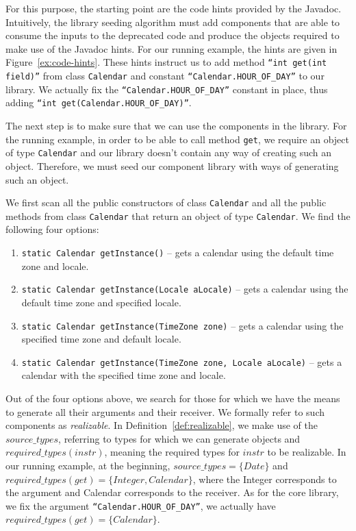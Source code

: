 \documentclass[sigconf,review,anonymous]{acmart}
\begin{document}
For this purpose, the starting point are the code hints provided by the Javadoc.
Intuitively, the library seeding algorithm must add components that are able to consume the
inputs to the deprecated code and produce the objects required to make use
of the Javadoc hints.
%
For our running example, the hints are given in Figure~\ref{ex:code-hints}.
These hints instruct us to add method \texttt{``int get(int field)''} from class
\texttt{Calendar} and constant \texttt{``Calendar.HOUR\_OF\_DAY''} to our library.
We actually fix the \texttt{``Calendar.HOUR\_OF\_DAY''} constant
in place, thus adding \texttt{``int get(Calendar.HOUR\_OF\_DAY)''}.

The next step is to make sure that we can use the components in the library.
For the running example, in order to be able to call method \texttt{get}, we require an object of
type \texttt{Calendar} and our library doesn't contain any way of creating such an object.
Therefore, we must seed our component library with ways of generating such an object.

We first scan all the public constructors of class \texttt{Calendar}
and all the public methods from class \texttt{Calendar} that return an object of type \texttt{Calendar}. We find the following four options:

\begin{enumerate}
  \item \texttt{static Calendar	getInstance()} -- gets a calendar using the default time zone and locale.
  \item \texttt{static Calendar getInstance(Locale aLocale)} -- gets a calendar using the default time zone and specified locale.
  \item \texttt{static Calendar	getInstance(TimeZone zone)} -- gets a calendar using the specified time zone and default locale.
  \item \texttt{static Calendar	getInstance(TimeZone zone, Locale aLocale)} -- gets a calendar with the specified time zone and locale.
\end{enumerate}

%
Out of the four options above, we search for those for which we have the means to generate all their arguments and their receiver. We formally refer to such components as {\em realizable}.
In Definition~\ref{def:realizable}, we make use of the $source\_types$, referring to types
for which we can generate objects and $required\_types(instr)$, meaning the required types
for $instr$ to be realizable. In our running example, at the beginning,
$source\_types=\{Date\}$ and $required\_types(get) = \{Integer, Calendar\}$, where the Integer
corresponds to the argument and Calendar corresponds to the receiver. As for the core library,
we fix the argument \texttt{``Calendar.HOUR\_OF\_DAY''}, we actually have $required\_types(get) = \{Calendar\}$.
\end{document}
